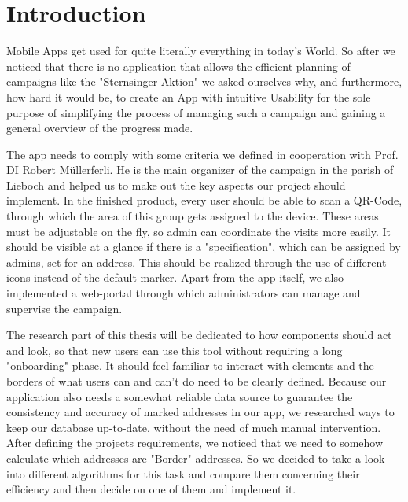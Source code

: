 \section{Introduction}


Mobile Apps get used for quite literally everything in today's World. So after we noticed that there is no application that allows the efficient planning of campaigns like the "Sternsinger-Aktion" we asked ourselves why, and furthermore, how hard it would be, to create an App with intuitive Usability for the sole purpose of simplifying the process of managing such a campaign and gaining a general overview of the progress made.

\blankLine

The app needs to comply with some criteria we defined in cooperation with Prof. DI Robert Müllerferli. He is the main organizer of the campaign in the parish of Lieboch and helped us to make out the key aspects our project should implement. In the finished product, every user should be able to scan a QR-Code, through which the area of this group gets assigned to the device. These areas must be adjustable on the fly, so admin can coordinate the visits more easily. It should be visible at a glance if there is a "specification", which can be assigned by admins, set for an address. This should be realized through the use of different icons instead of the default marker. Apart from the app itself, we also implemented a web-portal through which administrators can manage and supervise the campaign. 


\blankLine

The research part of this thesis will be dedicated to how components should act and look, so that new users can use this tool without requiring a long "onboarding" phase. It should feel familiar to interact with elements and the borders of what users can and can't do need to be clearly defined. Because our application also needs a somewhat reliable data source to guarantee the consistency and accuracy of marked addresses in our app, we researched ways to keep our database up-to-date, without the need of much manual intervention. After defining the projects requirements, we noticed that we need to somehow calculate which addresses are "Border" addresses. So we decided to take a look into different algorithms for this task and compare them concerning their efficiency and then decide on one of them and implement it.


